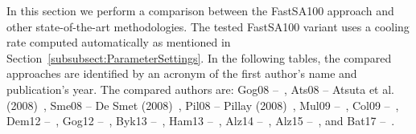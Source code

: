 In this section we perform a comparison between the FastSA100 approach and other state-of-the-art methodologies. The tested FastSA100 variant uses a cooling rate computed automatically as mentioned in Section~\ref{subsubsect:ParameterSettings}. In the following tables, the compared approaches are identified by an acronym of the first author's name and publication's year. The compared authors are: Gog08 --~\citep{Gogos2008}, Ats08 -- Atsuta et al. (2008)~\citep{McCollum2010}, Sme08 -- De Smet (2008)~\citep{McCollum2010}, Pil08 -- Pillay (2008)~\citep{McCollum2010}, Mul09 --~\citep{Muller2009}, Col09 --~\citep{McCollum2009}, Dem12 --~\citep{Demeester2012}, Gog12 --~\citep{Gogos2012}, Byk13 --~\citep{Bykov2013}, Ham13 --~\citep{Hamilton-Bryce2013}, Alz14 --~\citep{Alzaqebah2014}, Alz15 --~\citep{Alzaqebah2015}, and Bat17 --~\citep{Battistutta2017}.




